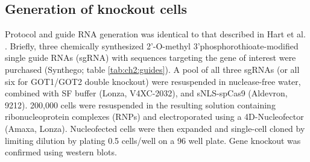 \subsection{Generation of knockout cells}
Protocol and guide RNA generation was identical to that described in Hart et al. \cite{Hart2023-gp}.
Briefly, three chemically synthesized 2'-O-methyl 3’phosphorothioate-modified single guide RNAs (sgRNA) with sequences targeting the gene of interest were purchased (Synthego; table \ref{tab:ch2:guides}).
A pool of all three sgRNAs (or all six for GOT1/GOT2 double knockout) were resuspended in nuclease-free water, combined with SF buffer (Lonza, V4XC-2032), and sNLS-spCas9 (Aldevron, 9212).
200,000 cells were resuspended in the resulting solution containing ribonucleoprotein complexes (RNPs) and electroporated using a 4D-Nucleofector (Amaxa, Lonza).
Nucleofected cells were then expanded and single-cell cloned by limiting dilution by plating 0.5 cells/well on a 96 well plate.
Gene knockout was confirmed using western blots.



